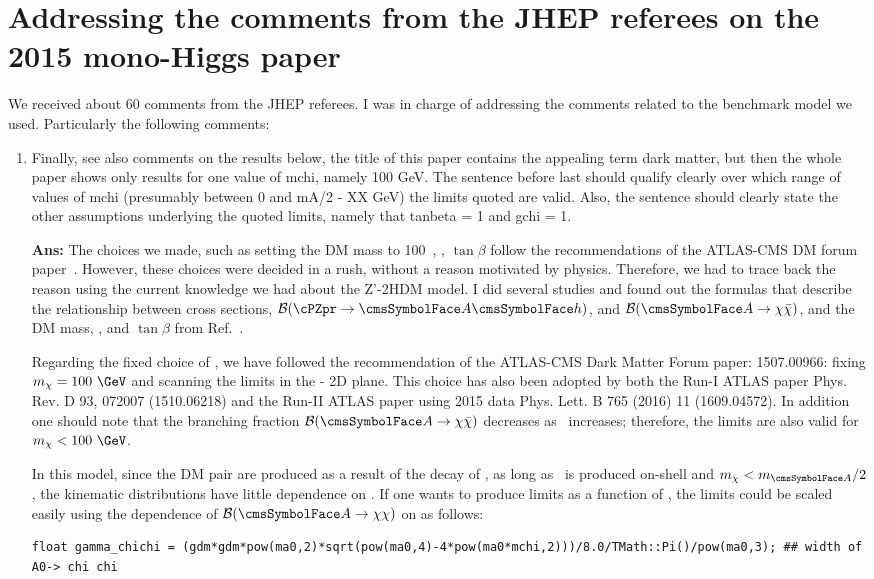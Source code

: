 \section{Addressing the comments from the JHEP referees on the 2015 mono-Higgs paper}
We received about 60 comments from the JHEP referees. I was in charge of addressing the comments related to the benchmark model we used. Particularly the following comments:
\begin{enumerate}
\item Finally, see also comments on the results below, the title of this paper contains the appealing term dark matter, but then the whole paper shows only results for one value of mchi, namely 100 GeV. The sentence before last should qualify clearly over which range of values of mchi (presumably between 0 and mA/2 - XX GeV) the limits quoted are valid. Also, the sentence should clearly state the other assumptions underlying the quoted limits, namely that tanbeta = 1 and gchi = 1.

{\bf Ans:} The choices we made, such as setting the DM mass to 100~\GeV, , $\tan\beta$ follow the recommendations of the ATLAS-CMS DM forum 
paper~\cite{Abercrombie:2015wmb}. However, these choices were decided in a rush, without a reason motivated by physics. Therefore, we had to trace back 
the reason using the current knowledge we had about the Z'-2HDM model. I did several studies and found out the formulas that describe the 
relationship between cross sections, ${\cal B}(\cPZpr\rightarrow \Az \Ph)$, and ${\cal B}(\Az\rightarrow\chi\bar{\chi})$, and the DM mass, \gzp, and 
$\tan\beta$ from Ref.~\cite{2HDM}. 

Regarding the fixed choice of \mdm, we have followed the recommendation of the ATLAS-CMS Dark Matter Forum paper: 1507.00966: fixing $\mdm = 100~\GeV$ and scanning the limits in the \maz - \mzp 2D plane. This choice has also been adopted by both the Run-I ATLAS paper Phys. Rev. D 93, 072007 (1510.06218) and the Run-II ATLAS paper using 2015 data Phys. Lett. B 765 (2016) 11 (1609.04572). 
In addition one should note that the branching fraction ${\cal B}(\Az\rightarrow \chi\bar{\chi})$ decreases as \mdm\ increases; therefore, the 
limits are also valid for $\mdm < 100~\GeV$.

In this model, since the DM pair are produced as a result of the decay of \Az, as long as \Az\ is produced on-shell and $\mdm<\maz/2$, the 
kinematic distributions have little dependence on \mdm. If one wants to produce limits as a function of \mdm, the limits could be scaled easily using the dependence of ${\cal B}(\Az\rightarrow \chi \chi)$ on \mdm as follows: 
\begin{tiny}
\begin{verbatim}
float gamma_chichi = (gdm*gdm*pow(ma0,2)*sqrt(pow(ma0,4)-4*pow(ma0*mchi,2)))/8.0/TMath::Pi()/pow(ma0,3); ## width of A0-> chi chi 


\end{verbatim}
\end{tiny}
\end{enumerate}
